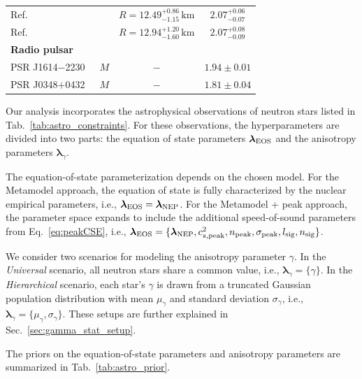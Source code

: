 \documentclass[prd,twocolumn,a4paper,floatfix,nofootinbib,preprintnumbers,superscriptaddress]{revtex4-1}
\begin{document}
\begin{table}
\begin{tabular*}{\textwidth}{@{\extracolsep{\fill}}lccc}
        \hspace{0.05cm}Ref.~\cite{Salmi:2024aum}        && $R=12.49^{+0.86}_{-1.15}\,\text{km}$ & $2.07^{+0.06}_{-0.07}$\\
        \hspace{0.05cm}Ref.~\cite{Dittmann:2024mbo}     && $R=12.94^{+1.20}_{-1.60}\,\text{km}$ & $2.07^{+0.08}_{-0.09}$\\
        \textbf{Radio pulsar} &&& \\
        \hspace{0.05cm}PSR J1614$-$2230~\cite{NANOGrav:2023hde}            & $M$ & $-$ & $1.94\pm0.01$\\
        \hspace{0.05cm}PSR J0348$+$0432~\cite{Antoniadis:2013pzd,Saffer:2024tlb} & $M$ & $-$ & $1.81\pm0.04$\\
        \hline
    \end{tabular*}
\end{table}
Our analysis incorporates the astrophysical observations of neutron stars listed in Tab.~\ref{tab:astro_constraints}. For these observations, the hyperparameters are divided into two parts: the equation of state parameters $\boldsymbol{\lambda}_{\rm EOS}$ and the anisotropy parameters $\boldsymbol{\lambda}_{\gamma}$.

The equation-of-state parameterization depends on the chosen model. For the Metamodel approach, the equation of state is fully characterized by the nuclear empirical parameters, i.e., $\boldsymbol{\lambda}_{\rm EOS} = \boldsymbol{\lambda}_{\rm NEP}$. For the Metamodel + peak approach, the parameter space expands to include the additional speed-of-sound parameters from Eq.~\eqref{eq:peakCSE}, i.e., $\boldsymbol{\lambda}_{\rm EOS} = \{\boldsymbol{\lambda}_{\rm NEP}, c^2_{s, {\rm peak}}, n_{{\rm peak}}, \sigma_{{\rm peak}}, l_{{\rm sig}}, n_{{\rm sig}}\}$.

We consider two scenarios for modeling the anisotropy parameter $\gamma$. In the \textit{Universal} scenario, all neutron stars share a common value, i.e., $\boldsymbol{\lambda}_{\gamma} = \{\gamma\}$. In the \textit{Hierarchical} scenario, each star's $\gamma$ is drawn from a truncated Gaussian population distribution with mean $\mu_\gamma$ and standard deviation $\sigma_\gamma$, i.e., $\boldsymbol{\lambda}_{\gamma} = \{\mu_\gamma, \sigma_\gamma\}$. These setups are further explained in Sec.~\ref{sec:gamma_stat_setup}.

The priors on the equation-of-state parameters and anisotropy parameters are summarized in Tab.~\ref{tab:astro_prior}.
\end{document}
